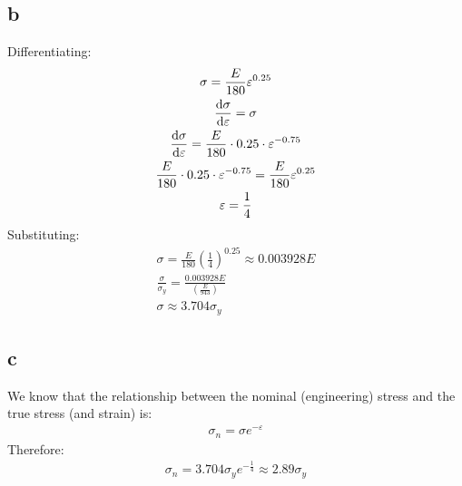 \subsection{b}
Differentiating:
\begin{gather}
    \sigma  = \frac{E}{180}\varepsilon^{0.25}\\
    \frac{\dif \sigma}{\dif \varepsilon} = \sigma\\
    \frac{\dif \sigma}{\dif \varepsilon} = \frac{E}{180}\cdot 0.25 \cdot \varepsilon^{-0.75}\\
    \frac{E}{180}\cdot 0.25 \cdot \varepsilon^{-0.75} = \frac{E}{180}\varepsilon^{0.25}\\
    \varepsilon = \frac{1}{4}
\end{gather}
Substituting:
\begin{gather}
    \sigma = \frac{E}{180}\left(\frac{1}{4}\right)^{0.25} \approx 0.003928E\\
    \frac{\sigma}{\sigma_y} = \frac{0.003928E}{\left(\frac{E}{943}\right)}\\
    \sigma \approx 3.704 \sigma_y
\end{gather}
\subsection{c}
We know that the relationship between the nominal (engineering) stress and the true stress (and strain) is:
\begin{gather}
    \sigma_n = \sigma e^{-\varepsilon}
\end{gather}
Therefore:
\begin{gather}
    \sigma_n = 3.704\sigma_y e^{-\frac{1}{4}} \approx 2.89\sigma_y
\end{gather}